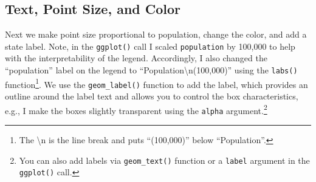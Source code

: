 \documentclass[]{krantz}
\makeatletter
\newenvironment{Shaded}{\begin{snugshade}}{\end{snugshade}}
\newcommand{\CharTok}[1]{\textcolor[rgb]{0.5,0.5,0.5}{#1}}
\newcommand{\DataTypeTok}[1]{\textcolor[rgb]{0.27,0.27,0.27}{#1}}
\newcommand{\DecValTok}[1]{\textcolor[rgb]{0.06,0.06,0.06}{#1}}
\newcommand{\FloatTok}[1]{\textcolor[rgb]{0.06,0.06,0.06}{#1}}
\newcommand{\KeywordTok}[1]{\textcolor[rgb]{0.27,0.27,0.27}{\textbf{#1}}}
\newcommand{\NormalTok}[1]{#1}
\newcommand{\OperatorTok}[1]{\textcolor[rgb]{0.43,0.43,0.43}{\textbf{#1}}}
\newcommand{\StringTok}[1]{\textcolor[rgb]{0.5,0.5,0.5}{#1}}
\newenvironment{kframe}{%
\medskip{}
\setlength{\fboxsep}{.8em}
 \def\at@end@of@kframe{}%
 \ifinner\ifhmode%
  \def\at@end@of@kframe{\end{minipage}}%
  \begin{minipage}{\columnwidth}%
 \fi\fi%
 \def\FrameCommand##1{\hskip\@totalleftmargin \hskip-\fboxsep
 \colorbox{shadecolor}{##1}\hskip-\fboxsep
     \hskip-\linewidth \hskip-\@totalleftmargin \hskip\columnwidth}%
 \MakeFramed {\advance\hsize-\width
   \@totalleftmargin\z@ \linewidth\hsize
   \@setminipage}}%
 {\par\unskip\endMakeFramed%
 \at@end@of@kframe}
\renewenvironment{Shaded}{\begin{kframe}}{\end{kframe}}
\makeatother
\begin{document}
\hypertarget{text-point-size-and-color}{%
\subsection{Text, Point Size, and Color}\label{text-point-size-and-color}}

Next we make point size proportional to population, change the color, and add a state label. Note, in the \texttt{ggplot()} call I scaled \texttt{population} by 100,000 to help with the interpretability of the legend. Accordingly, I also changed the ``population'' label on the legend to ``Population\textbackslash{}n(100,000)'' using the \texttt{labs()} function\footnote{The \textbackslash{}n is the line break and puts ``(100,000)'' below ``Population''.}. We use the \texttt{geom\_label()} function to add the label, which provides an outline around the label text and allows you to control the box characteristics, e.g., I make the boxes slightly transparent using the \texttt{alpha} argument.\footnote{You can also add labels via \texttt{geom\_text()} function or a \texttt{label} argument in the \texttt{ggplot()} call.}

\begin{Shaded}
\end{Shaded}
\end{document}
